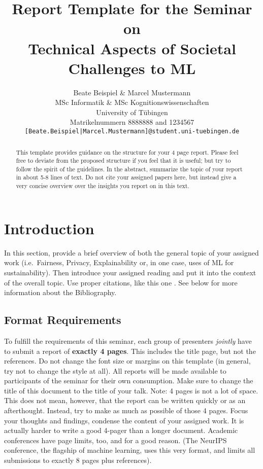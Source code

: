 \documentclass{article}
\title{Report Template for the Seminar on\\ Technical Aspects of Societal Challenges to ML}
\author{%
  Beate Beispiel \& Marcel Mustermann\\
  MSc Informatik \& MSc Kognitionswissenschaften\\
  University of Tübingen\\
  Matrikelnummern 8888888 and 1234567\\
  \texttt{[Beate.Beispiel|Marcel.Mustermann]@student.uni-tuebingen.de}
}
\begin{document}
\maketitle

\begin{abstract}
  This template provides guidance on the structure for your 4 page report. Please feel free to deviate from the proposed structure if you feel that it is useful; but try to follow the spirit of the guidelines.
  In the abstract, summarize the topic of your report in about 5-8 lines of text. Do not cite your assigned papers here, but instead give a very concise overview over the insights you report on in this text.
\end{abstract}

\section{Introduction}

In this section, provide a brief overview of both the general topic of your assigned work (i.e.~Fairness, Privacy, Explainability or, in one case, uses of ML for sustainability). Then introduce your assigned reading and put it into the context of the overall topic. Use proper citations, like this one \cite{NIPS2016_6300}. See below for more information about the Bibliography.

\subsection{Format Requirements}

To fulfill the requirements of this seminar, each group of presenters \emph{jointly} have to submit a report of \textbf{exactly 4 pages}. This includes the title page, but not the references. Do not change the font size or margins on this template (in general, try not to change the style at all). All reports will be made available to participants of the seminar for their own consumption. Make sure to change the title of this document to the title of your talk. Note: 4 pages is not a lot of space. This does not mean, however, that the report can be written quickly or as an afterthought. Instead, try to make as much as possible of those 4 pages. Focus your thoughts and findings, condense the content of your assigned work. It is actually harder to write a good 4-pager than a longer document. Academic conferences have page limits, too, and for a good reason. (The NeurIPS conference, the flagship of machine learning, uses this very format, and limits all submissions to exactly 8 pages plus references).
\end{document}

